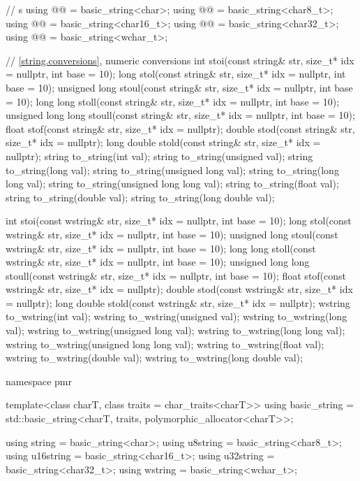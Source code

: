\begin{codeblock}
{  //  s
  using @@    = basic_string<char>;
  using @@  = basic_string<char8_t>;
  using @@ = basic_string<char16_t>;
  using @@ = basic_string<char32_t>;
  using @@   = basic_string<wchar_t>;

  // \ref{string.conversions}, numeric conversions
  int stoi(const string& str, size_t* idx = nullptr, int base = 10);
  long stol(const string& str, size_t* idx = nullptr, int base = 10);
  unsigned long stoul(const string& str, size_t* idx = nullptr, int base = 10);
  long long stoll(const string& str, size_t* idx = nullptr, int base = 10);
  unsigned long long stoull(const string& str, size_t* idx = nullptr, int base = 10);
  float stof(const string& str, size_t* idx = nullptr);
  double stod(const string& str, size_t* idx = nullptr);
  long double stold(const string& str, size_t* idx = nullptr);
  string to_string(int val);
  string to_string(unsigned val);
  string to_string(long val);
  string to_string(unsigned long val);
  string to_string(long long val);
  string to_string(unsigned long long val);
  string to_string(float val);
  string to_string(double val);
  string to_string(long double val);

  int stoi(const wstring& str, size_t* idx = nullptr, int base = 10);
  long stol(const wstring& str, size_t* idx = nullptr, int base = 10);
  unsigned long stoul(const wstring& str, size_t* idx = nullptr, int base = 10);
  long long stoll(const wstring& str, size_t* idx = nullptr, int base = 10);
  unsigned long long stoull(const wstring& str, size_t* idx = nullptr, int base = 10);
  float stof(const wstring& str, size_t* idx = nullptr);
  double stod(const wstring& str, size_t* idx = nullptr);
  long double stold(const wstring& str, size_t* idx = nullptr);
  wstring to_wstring(int val);
  wstring to_wstring(unsigned val);
  wstring to_wstring(long val);
  wstring to_wstring(unsigned long val);
  wstring to_wstring(long long val);
  wstring to_wstring(unsigned long long val);
  wstring to_wstring(float val);
  wstring to_wstring(double val);
  wstring to_wstring(long double val);

  namespace pmr {
    template<class charT, class traits = char_traits<charT>>
      using basic_string = std::basic_string<charT, traits, polymorphic_allocator<charT>>;

    using string    = basic_string<char>;
    using u8string  = basic_string<char8_t>;
    using u16string = basic_string<char16_t>;
    using u32string = basic_string<char32_t>;
    using wstring   = basic_string<wchar_t>;
  }

}
\end{codeblock}
